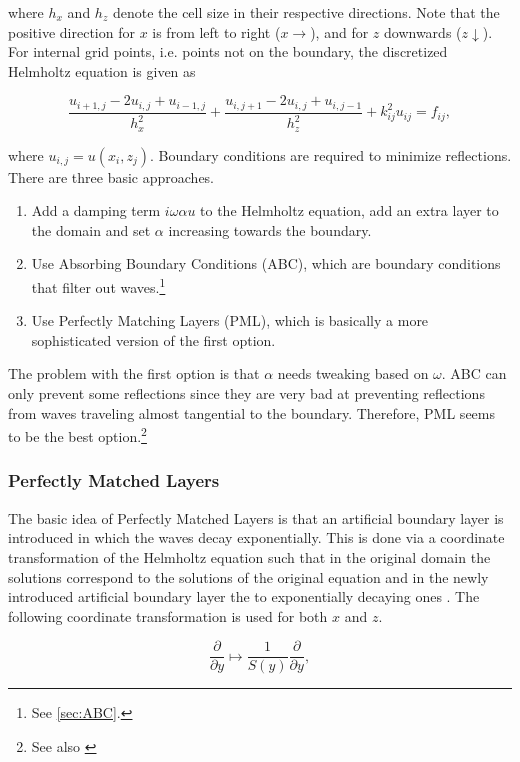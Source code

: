 \documentclass[10pt,a4paper]{article}
\begin{document}
where $h_x$ and $h_z$ denote the cell size in their respective directions. Note that the positive direction for $x$ is from left to right ($x\rightarrow$), and for $z$ downwards ($z\downarrow$). For internal grid points, i.e. points not on the boundary, the discretized Helmholtz equation is given as 

\begin{equation} \label{eqn:discret}
\frac{u_{i+1,j}-2u_{i,j}+u_{i-1,j}}{h_x^2} + \frac{u_{i,j+1}-2u_{i,j}+u_{i,j-1}}{h_z^2} + k_{ij}^2u_{ij}= f_{ij},
\end{equation}

where $u_{i,j}=u(x_i,z_j)$. Boundary conditions are required to minimize reflections. There are three basic approaches.
\begin{enumerate}
	\item Add a damping term $i\omega\alpha u$ to the Helmholtz equation, add an extra layer to the domain and set $\alpha$ increasing towards the boundary.
	\item Use Absorbing Boundary Conditions (ABC), which are boundary conditions that filter out waves.\footnote{See \cref{sec:ABC}.}
	\item Use Perfectly Matching Layers (PML), which is basically a more sophisticated version of the first option.
\end{enumerate}

The problem with the first option is that $\alpha$ needs tweaking based on $\omega$. ABC can only prevent some reflections since they are very bad at preventing reflections from waves traveling almost tangential to the boundary. Therefore, PML seems to be the best option.\footnote{See also \cite{Comparison}}

\subsubsection{Perfectly Matched Layers}
The basic idea of Perfectly Matched Layers is that an artificial boundary layer is introduced in which the waves decay exponentially. This is done via a coordinate transformation of the Helmholtz equation such that in the original domain the solutions correspond to the solutions of the original equation and in the newly introduced artificial boundary layer the to exponentially decaying ones \cite{Erlangga2008}. The following coordinate transformation is used for both $x$ and $z$.

\begin{equation}
\frac{\partial }{\partial y} \mapsto \frac{1}{S(y)}\frac{\partial}{\partial y},
\end{equation}
\end{document}
